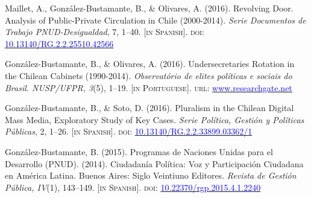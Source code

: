 \begin{publications}

\begin{benumerate}{4}

\item{\small Maillet, A., González-Bustamante, B., \& Olivares, A. (2016). Revolving Door. Analysis of Public-Private Circulation in Chile (2000-2014). {\itshape Serie Documentos de Trabajo PNUD-Desigualdad}, 7, 1--40. {\footnotesize \scshape [in Spanish]}. {\scshape doi}: \href{http://doi.org/10.13140/RG.2.2.25510.42566}{\textcolor{blue}{10.13140/RG.2.2.25510.42566}}}\vspace{1mm}

\item{\small González-Bustamante, B., \& Olivares, A. (2016). Undersecretaries Rotation in the Chilean Cabinets (1990-2014). {\itshape Observat\'orio de elites pol\'iticas e sociais do Brasil. NUSP/UFPR, 3}(5), 1--19. {\footnotesize \scshape [in Portuguese]}. {\scshape url}: \href{https://www.researchgate.net/publication/321993740_A_rotatividade_de_subsecretarios_dos_ministerios_no_Chile_1990-2014}{\textcolor{blue}{www.researchgate.net}}}\vspace{1mm}

\item{\small González-Bustamante, B., \& Soto, D. (2016). Pluralism in the Chilean Digital Mass Media, Exploratory Study of Key Cases. {\itshape Serie Pol\'itica, Gesti\'on y Pol\'iticas P\'ublicas}, 2, 1--26. {\footnotesize \scshape [in Spanish]}. {\scshape doi}: \href{http://doi.org/10.13140/RG.2.2.33899.03362/1}{\textcolor{blue}{10.13140/RG.2.2.33899.03362/1}}}\vspace{1mm}

\item{\small González-Bustamante, B. (2015). Programas de Naciones Unidas para el Desarrollo (PNUD). (2014). Ciudadanía Política: Voz y Participación Ciudadana en América Latina. Buenos Aires: Siglo Veintiuno Editores. {\itshape Revista de Gestión Pública, IV}(1), 143--149. {\footnotesize \scshape [in Spanish]}. {\scshape doi}: \href{https://doi.org/10.22370/rgp.2015.4.1.2240}{\textcolor{blue}{10.22370/rgp.2015.4.1.2240}}}\vspace{1mm}

\end{benumerate}

\end{publications}

